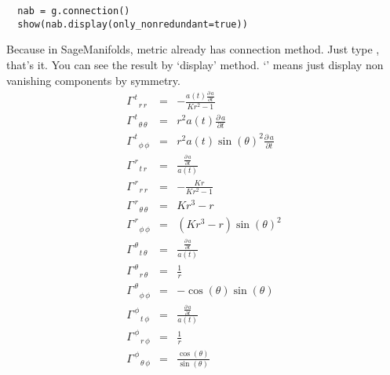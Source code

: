 \documentclass[%
 reprint,
 amsmath,amssymb,
 aps,
]{revtex4-1}
\begin{document}
\begin{lstlisting}
  nab = g.connection()
  show(nab.display(only_nonredundant=true))
\end{lstlisting}
Because in SageManifolds, metric already has connection method. Just type
, that's it. You can see the result by `display' method.
`' means just display non vanishing components by
symmetry. 
\begin{eqnarray*}
  \Gamma_{ \phantom{\, t} \, r \, r }^{ \, t \phantom{\, r}
  \phantom{\, r} } & = & -\frac{a\left(t\right) \frac{\partial\,a}{\partial t}}{K r^{2} - 1} \\
  \Gamma_{ \phantom{\, t} \, {\theta} \, {\theta} }^{ \, t \phantom{\, {\theta}}
  \phantom{\, {\theta}} } & = & r^{2} a\left(t\right)
                                \frac{\partial\,a}{\partial t} \\
  \Gamma_{ \phantom{\, t} \, {\phi} \, {\phi} }^{ \, t \phantom{\, {\phi}}
  \phantom{\, {\phi}} } & = & r^{2} a\left(t\right) \sin\left({\theta}\right)^{2}
                              \frac{\partial\,a}{\partial t} \\
  \Gamma_{\phantom{\, r} \, t \, r }^{ \, r \phantom{\, t} \phantom{\, r} } & =
                       & \frac{\frac{\partial\,a}{\partial t}}{a\left(t\right)}
  \\
  \Gamma_{ \phantom{\, r} \, r \, r }^{ \, r \phantom{\, r} \phantom{\, r} } & =
                       & -\frac{K r}{K r^{2} - 1} \\
  \Gamma_{ \phantom{\, r} \, {\theta} \, {\theta} }^{ \, r \phantom{\, {\theta}}
  \phantom{\, {\theta}} } & = & K r^{3} - r \\
  \Gamma_{ \phantom{\, r} \, {\phi} \, {\phi} }^{ \, r \phantom{\, {\phi}}
  \phantom{\, {\phi}} } & = & {\left(K r^{3} - r\right)}
                              \sin\left({\theta}\right)^{2} \\
  \Gamma_{ \phantom{\, {\theta}} \, t \, {\theta} }^{ \, {\theta} \phantom{\, t}
  \phantom{\, {\theta}} } & = & \frac{\frac{\partial\,a}{\partial
                                t}}{a\left(t\right)} \\
  \Gamma_{ \phantom{\, {\theta}} \, r \, {\theta} }^{ \, {\theta} \phantom{\, r}
  \phantom{\, {\theta}} } & = & \frac{1}{r} \\
  \Gamma_{ \phantom{\, {\theta}} \, {\phi} \, {\phi} }^{ \, {\theta} \phantom{\,
  {\phi}} \phantom{\, {\phi}} } & = & -\cos\left({\theta}\right)
                                      \sin\left({\theta}\right) \\
  \Gamma_{ \phantom{\, {\phi}} \, t \, {\phi} }^{ \, {\phi} \phantom{\, t}
  \phantom{\, {\phi}} } & = & \frac{\frac{\partial\,a}{\partial
                              t}}{a\left(t\right)} \\
  \Gamma_{ \phantom{\, {\phi}} \, r \, {\phi} }^{ \, {\phi} \phantom{\, r} \phantom{\, {\phi}} } & = & \frac{1}{r} \\
  \Gamma_{ \phantom{\, {\phi}} \, {\theta} \, {\phi} }^{ \, {\phi} \phantom{\,
  {\theta}} \phantom{\, {\phi}} } & = &
                                        \frac{\cos\left({\theta}\right)}{\sin\left({\theta}\right)}
\end{eqnarray*}
\end{document}
